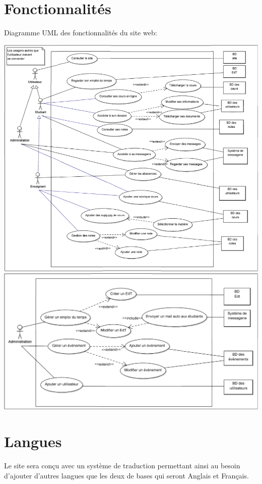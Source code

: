 \documentclass[oneside]{report}
\begin{document}
{		\section{Fonctionnalités}
		{
			\par Diagramme UML des fonctionnalités du site web:\\
			\begin{center}
				\includegraphics[scale=1.5]{uml_base}
				\\
				\includegraphics[scale=1.5]{uml_admin}
			\end{center}
		}
		\section{Langues}
		{
			\par Le site sera conçu avec un système de traduction permettant ainsi au besoin d'ajouter d'autres langues que les deux de bases qui seront Anglais et Français.
		}
	}
\end{document}
